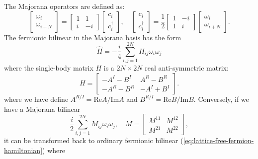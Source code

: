 The Majorana operators are defined as:
\begin{equation}
	\left[\begin{array}{c} \omega_{i} \\ \omega_{i+N} \end{array}\right]
	= \left[\begin{array}{cc} 
		1 & 1 \\ 
		i & -i 
	\end{array}\right] \left[\begin{array}{c} 
		c_i \\ c_i^\dagger 
	\end{array}\right], \quad 
	\left[\begin{array}{c} c_i \\ c_i^\dagger \end{array}\right]
	= \frac{1}{2} \left[\begin{array}{cc} 
		1 & -i \\ 
		1 & i 
	\end{array}\right] \left[\begin{array}{c} 
		\omega_{i} \\ \omega_{i+N}
	\end{array}\right].
\end{equation}
The fermionic bilinear in the Majorana basis has the form
\begin{equation}
	\hat H = -\frac{i}{4} \sum_{i,j=1}^{2N} H_{ij} \omega_i \omega_j
\end{equation}
where the single-body matrix $H$ is a $2N \times 2N$ real anti-symmetric matrix:
\begin{equation}
	H = \left[\begin{array}{cc} 
		-A^I - B^I & A^R - B^R \\
    	-A^R - B^R &  -A^I + B^I 
	\end{array}\right].
\end{equation}
where we have define $A^{R/I} = \mathrm{Re} A / \mathrm{Im} A$ and $B^{R/I} = \mathrm{Re} B / \mathrm{Im} B$.
Conversely, if we have a Majorana bilinear 
\begin{equation}
	\frac{i}{2} \sum_{i,j=1}^{2N} M_{ij}\omega_i \omega_j, \quad
	M = \left[\begin{array}{cc}
		M^{11} & M^{12} \\ M^{21} & M^{22}
	\end{array} \right],
\end{equation}
it can be transformed back to ordinary fermionic bilinear (\ref{eq:lattice-free-fermion-hamiltonian}) where
